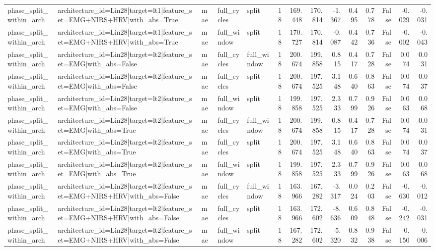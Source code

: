 \begin{table}
\begin{tabular}{lllllrrrrrrrrr}
phase_split_within_arch & architecture_id=Lin28|target=lt1|feature_set=EMG+NIRS+HRV|with_abs=True & mae & full_cycles & split & 18 & 169.448 & 170.814 & -1.367 & 0.495 & 0.778 & False & -0.029 & -0.031 \\
phase_split_within_arch & architecture_id=Lin28|target=lt1|feature_set=EMG+NIRS+HRV|with_abs=True & mae & full_window & split & 18 & 170.727 & 170.814 & -0.087 & 0.442 & 0.736 & False & -0.002 & -0.043 \\
phase_split_within_arch & architecture_id=Lin28|target=lt2|feature_set=EMG|with_abs=False & mae & full_cycles & full_window & 18 & 200.674 & 199.858 & 0.815 & 0.417 & 0.728 & False & 0.074 & 0.031 \\
phase_split_within_arch & architecture_id=Lin28|target=lt2|feature_set=EMG|with_abs=False & mae & full_cycles & split & 18 & 200.674 & 197.525 & 3.148 & 0.640 & 0.863 & False & 0.074 & 0.037 \\
phase_split_within_arch & architecture_id=Lin28|target=lt2|feature_set=EMG|with_abs=False & mae & full_window & split & 18 & 199.858 & 197.525 & 2.333 & 0.799 & 0.926 & False & 0.063 & 0.068 \\
phase_split_within_arch & architecture_id=Lin28|target=lt2|feature_set=EMG|with_abs=True & mae & full_cycles & full_window & 18 & 200.674 & 199.858 & 0.815 & 0.417 & 0.728 & False & 0.074 & 0.031 \\
phase_split_within_arch & architecture_id=Lin28|target=lt2|feature_set=EMG|with_abs=True & mae & full_cycles & split & 18 & 200.674 & 197.525 & 3.148 & 0.640 & 0.863 & False & 0.074 & 0.037 \\
phase_split_within_arch & architecture_id=Lin28|target=lt2|feature_set=EMG|with_abs=True & mae & full_window & split & 18 & 199.858 & 197.525 & 2.333 & 0.799 & 0.926 & False & 0.063 & 0.068 \\
phase_split_within_arch & architecture_id=Lin28|target=lt2|feature_set=EMG+NIRS+HRV|with_abs=False & mae & full_cycles & full_window & 18 & 163.966 & 167.282 & -3.317 & 0.024 & 0.203 & False & -0.630 & -0.012 \\
phase_split_within_arch & architecture_id=Lin28|target=lt2|feature_set=EMG+NIRS+HRV|with_abs=False & mae & full_cycles & split & 18 & 163.966 & 172.602 & -8.636 & 0.609 & 0.848 & False & -0.242 & -0.031 \\
phase_split_within_arch & architecture_id=Lin28|target=lt2|feature_set=EMG+NIRS+HRV|with_abs=False & mae & full_window & split & 18 & 167.282 & 172.602 & -5.320 & 0.832 & 0.938 & False & -0.150 & -0.006 \\

\end{tabular}
\end{table}
